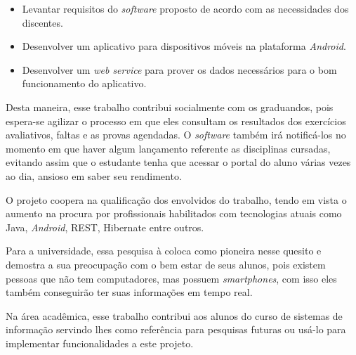 	\begin{itemize}
	  
	  \item Levantar requisitos do \textit{software} proposto de acordo com as
	  necessidades dos discentes.
	  
	  \item Desenvolver um aplicativo para dispositivos móveis na plataforma
	  \textit{Android}.
	  
	  \item Desenvolver um \textit{web service} para prover os dados necessários
	  para o bom funcionamento do aplicativo.
	
	\end{itemize}
	
	\par Desta maneira, esse trabalho contribui socialmente com os graduandos, pois
espera-se agilizar o processo em que eles consultam os resultados dos
exercícios avaliativos, faltas e as provas agendadas. O \textit{software}
também irá notificá-los no momento em que haver algum lançamento referente as
disciplinas cursadas, evitando assim que o estudante tenha que acessar o portal
do aluno várias vezes ao dia, ansioso em saber seu rendimento.

	\par O projeto coopera na qualificação dos envolvidos do trabalho, tendo em
vista o aumento na procura por profissionais habilitados com tecnologias atuais
como Java, \textit{Android}, REST, Hibernate entre outros.

	\par Para a universidade, essa pesquisa à coloca como pioneira nesse quesito e
demostra a sua preocupação com o bem estar de seus alunos, pois existem pessoas
que não tem computadores, mas possuem \textit{smartphones}, com isso eles
também conseguirão ter suas informações em tempo real.

	\par Na área acadêmica, esse trabalho contribui aos alunos do curso de sistemas
de informação servindo lhes como referência para pesquisas futuras ou usá-lo
para implementar funcionalidades a este projeto.
